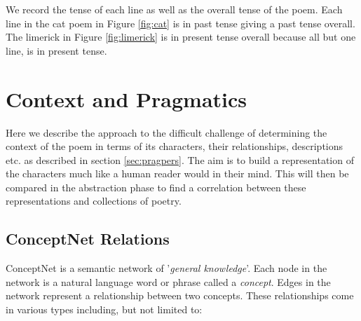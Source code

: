 We record the tense of each line as well as the overall tense of the poem. Each line in the cat poem in Figure \ref{fig:cat} is in past tense giving a past tense overall. The limerick in Figure \ref{fig:limerick} is in present tense overall because all but one line, is in present tense. 


\section{Context and Pragmatics}
Here we describe the approach to the difficult challenge of determining the context of the poem in terms of its characters, their relationships, descriptions etc. as described in section \ref{sec:pragpers}. The aim is to build a representation of the characters much like a human reader would in their mind. This will then be compared in the abstraction phase to find a correlation between these representations and collections of poetry.

\subsection{ConceptNet Relations}
ConceptNet is a semantic network of '\textit{general knowledge}'. Each node in the network is a natural language word or phrase called a \textit{concept}. Edges in the network represent a relationship between two concepts. These relationships come in various types including, but not limited to:

